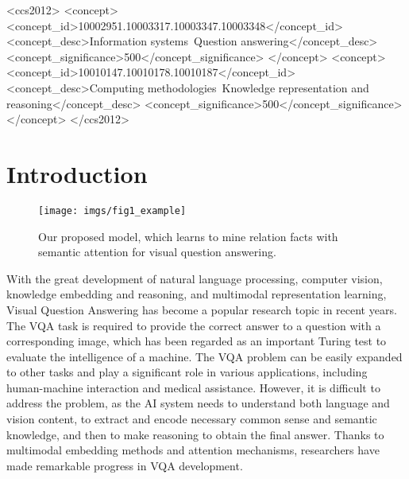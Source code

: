 \documentclass[sigconf]{acmart}
\begin{document}
\begin{CCSXML}
	<ccs2012>
	<concept>
	<concept_id>10002951.10003317.10003347.10003348</concept_id>
	<concept_desc>Information systems~Question answering</concept_desc>
	<concept_significance>500</concept_significance>
	</concept>
	<concept>
	<concept_id>10010147.10010178.10010187</concept_id>
	<concept_desc>Computing methodologies~Knowledge representation and reasoning</concept_desc>
	<concept_significance>500</concept_significance>
	</concept>
	</ccs2012>
\end{CCSXML}









\maketitle

\section{Introduction}


\begin{figure}[t]
	\centering
	\texttt{[image: imgs/fig1\_example]}
	\caption{Our proposed model, which learns to mine relation facts with semantic attention for visual question answering.}
	\label{example}
\end{figure}
\vspace{-0.5mm}

With the great development of natural language processing, computer vision, knowledge embedding and reasoning, and multimodal representation learning, Visual Question Answering has become a popular research topic in recent years. The VQA task is required to provide the correct answer to a question with a corresponding image, which has been regarded as an important Turing test to evaluate the intelligence of a machine. The VQA problem can be easily expanded to other tasks and play a significant role in various applications, including human-machine interaction and medical assistance. However, it is difficult to address the problem, as the AI system needs to understand both language and vision content, to extract and encode necessary common sense and semantic knowledge, and then to make reasoning to obtain the final answer. Thanks to multimodal embedding methods and attention mechanisms, researchers have made remarkable progress in VQA development.
\end{document}
